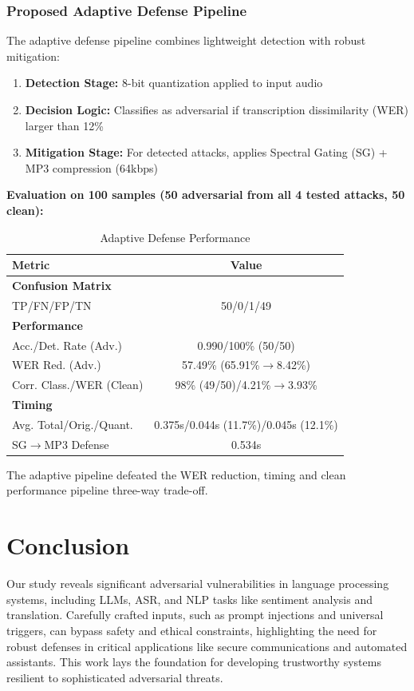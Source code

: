 \documentclass[conference]{IEEEtran}
\begin{document}
\subsubsection{Proposed Adaptive Defense Pipeline}
The adaptive defense pipeline combines lightweight detection with robust mitigation:
\begin{enumerate}
    \item \textbf{Detection Stage:} 8-bit quantization applied to input audio
    \item \textbf{Decision Logic:} Classifies as adversarial if transcription dissimilarity (WER) larger than 12\%
    \item \textbf{Mitigation Stage:} For detected attacks, applies Spectral Gating (SG) + MP3 compression (64kbps)
\end{enumerate}
\textbf{Evaluation on 100 samples (50 adversarial from all 4 tested attacks, 50 clean):}

\begin{table}[H]
\centering
\scriptsize
\caption{Adaptive Defense Performance}
\label{tab:adaptive_defense}
\begin{tabular}{l c}
\toprule
\textbf{Metric} & \textbf{Value} \\
\midrule
\textbf{Confusion Matrix} \\
TP/FN/FP/TN & 50/0/1/49 \\
\midrule
\textbf{Performance} \\
Acc./Det. Rate (Adv.) & 0.990/100\% (50/50) \\
WER Red. (Adv.) & 57.49\% (65.91\%$\to$8.42\%) \\
Corr. Class./WER (Clean) & 98\% (49/50)/4.21\%$\to$3.93\% \\
\midrule
\textbf{Timing} \\
Avg. Total/Orig./Quant. & 0.375s/0.044s (11.7\%)/0.045s (12.1\%) \\
SG$\to$MP3 Defense & 0.534s \\
\bottomrule
\end{tabular}
\end{table}

The adaptive pipeline defeated the WER reduction, timing and clean performance pipeline three-way trade-off.



\section{Conclusion}
Our study reveals significant adversarial vulnerabilities in language processing systems, including LLMs, ASR, and NLP tasks like sentiment analysis and translation. Carefully crafted inputs, such as prompt injections and universal triggers, can bypass safety and ethical constraints, highlighting the need for robust defenses in critical applications like secure communications and automated assistants. This work lays the foundation for developing trustworthy systems resilient to sophisticated adversarial threats.
\end{document}
